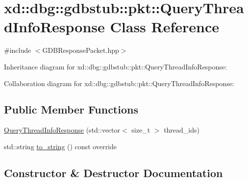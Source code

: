 \hypertarget{classxd_1_1dbg_1_1gdbstub_1_1pkt_1_1_query_thread_info_response}{}\section{xd\+:\+:dbg\+:\+:gdbstub\+:\+:pkt\+:\+:Query\+Thread\+Info\+Response Class Reference}
\label{classxd_1_1dbg_1_1gdbstub_1_1pkt_1_1_query_thread_info_response}


{\ttfamily \#include $<$G\+D\+B\+Response\+Packet.\+hpp$>$}



Inheritance diagram for xd\+:\+:dbg\+:\+:gdbstub\+:\+:pkt\+:\+:Query\+Thread\+Info\+Response\+:


Collaboration diagram for xd\+:\+:dbg\+:\+:gdbstub\+:\+:pkt\+:\+:Query\+Thread\+Info\+Response\+:
\subsection*{Public Member Functions}
\begin{DoxyCompactItemize}
\item 
\mbox{\hyperlink{classxd_1_1dbg_1_1gdbstub_1_1pkt_1_1_query_thread_info_response_a4bd864860eb4082b0baa173136bab111}{Query\+Thread\+Info\+Response}} (std\+::vector$<$ size\+\_\+t $>$ thread\+\_\+ids)
\item 
std\+::string \mbox{\hyperlink{classxd_1_1dbg_1_1gdbstub_1_1pkt_1_1_query_thread_info_response_a4c96e3015f3317681ec8ee1e63f78639}{to\+\_\+string}} () const override
\end{DoxyCompactItemize}


\subsection{Constructor \& Destructor Documentation}
\mbox{\label{classxd_1_1dbg_1_1gdbstub_1_1pkt_1_1_query_thread_info_response_a4bd864860eb4082b0baa173136bab111}} 
